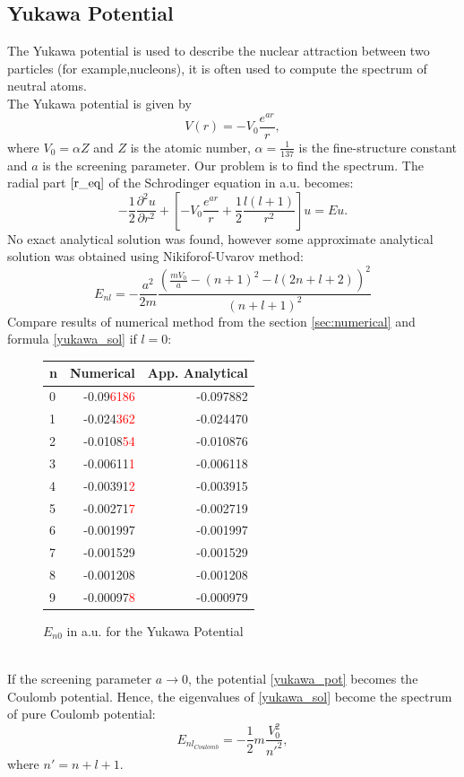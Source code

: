 \documentclass[a4paper, 12pt]{article}
\begin{document}
\subsection{Yukawa Potential}
The Yukawa potential is used to  describe the nuclear attraction between two particles (for example,nucleons), it is often used to compute the spectrum of neutral atoms.\\ 
The Yukawa potential is given by
\begin{equation}\label{yukawa_pot}
V(r) = -V_0\frac{e^{a r}}{r},
\end{equation}
where $V_0 = \alpha Z$ and $Z$ is the atomic number, $\alpha = \frac{1}{137}$ is the fine-structure constant and $a$ is the screening parameter.
Our problem is to find the spectrum. The radial part $\eqref{r_eq}$ of the Schrodinger equation in a.u. becomes:
$$-\frac{1}{2}\frac{\partial^2 u}{\partial r^2}+[-V_0\frac{e^{a r}}{r} +\frac{1}{2}\frac{l(l+1)}{r^2}]u = Eu.$$
No exact analytical solution was found, however some approximate analytical solution was obtained using Nikiforof-Uvarov method: 
\begin{equation}\label{yukawa_sol}
E_{nl} = -\frac{a^2}{2m}\frac{(\displaystyle{\frac{m V_0}{a}} - (n+1)^2 - l(2n+l+2))^2}{(n+l+1)^2}
\end{equation}
Compare results of numerical method from the section \ref{sec:numerical} and formula \eqref{yukawa_sol} if $l = 0$:
\begin{figure}[h!]
	\centering
	\begin{tabular}{lrr}
		\toprule
		{n} &  Numerical   &         App. Analytical \\
		\midrule
		0 & -0.09\textcolor{red}{6186} & -0.097882 \\
		1 & -0.024\textcolor{red}{362} & -0.024470 \\
		2 & -0.0108\textcolor{red}{54} & -0.010876 \\
		3 & -0.00611\textcolor{red}{1} & -0.006118 \\
		4 & -0.00391\textcolor{red}{2} & -0.003915 \\
		5 & -0.00271\textcolor{red}{7} & -0.002719 \\
		6 & -0.001997 & -0.001997 \\
		7 & -0.001529 & -0.001529 \\
		8 & -0.001208 & -0.001208 \\
		9 & -0.00097\textcolor{red}{8} & -0.000979 \\
		\bottomrule
	\end{tabular}
	\caption{$E_{n0}$ in a.u. for the Yukawa Potential}
\end{figure}\\
If the screening parameter $ a\to 0$, the potential \eqref{yukawa_pot} becomes the Coulomb potential. Hence, the eigenvalues of \eqref{yukawa_sol} become the spectrum of pure Coulomb potential:
$$E_{nl}_{Coulomb} = -\frac{1}{2} m \frac{V_0^2}{n'^2},$$
where $n' = n+l+1.$
\end{document}
